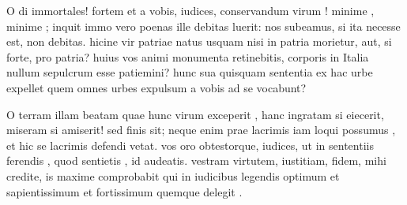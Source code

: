  O di immortales! fortem et a vobis, iudices, conservandum virum ! minime , minime ; inquit immo vero poenas ille debitas luerit: nos subeamus, si ita necesse est, non debitas. hicine vir patriae natus usquam nisi in patria morietur, aut, si forte, pro patria? huius vos animi monumenta retinebitis, corporis in Italia nullum sepulcrum esse patiemini? hunc sua quisquam sententia ex hac urbe expellet quem omnes urbes expulsum a vobis ad se vocabunt?

 O terram illam beatam quae hunc virum exceperit , hanc ingratam si eiecerit, miseram si amiserit! sed finis sit; neque enim prae lacrimis iam loqui possumus , et hic se lacrimis defendi vetat. vos oro obtestorque, iudices, ut in sententiis ferendis , quod sentietis , id audeatis. vestram virtutem, iustitiam, fidem, mihi credite, is maxime comprobabit qui in iudicibus legendis optimum et sapientissimum et fortissimum quemque delegit .
